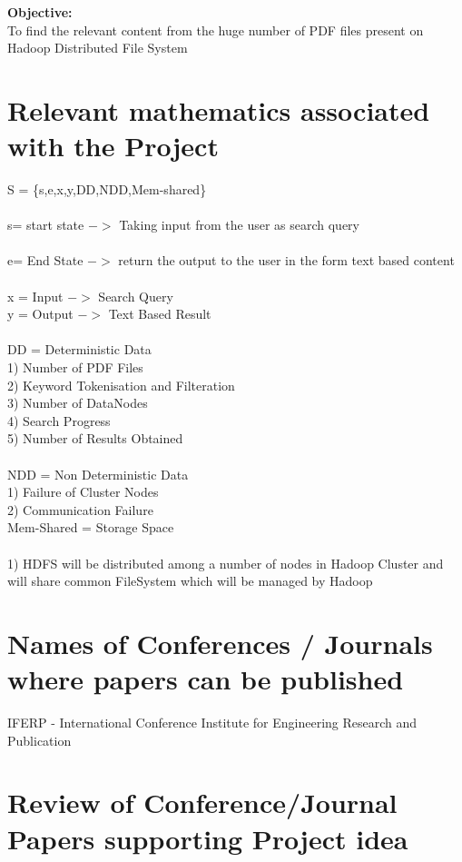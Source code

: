 \documentclass[oneside,a4paper,12pt]{article}
\begin{document}
\noindent \textbf{Objective:} \\
To find the relevant content from the huge number of PDF files present on Hadoop Distributed File System \\

	
\section{Relevant mathematics associated with the Project}
\noindent
S = \{s,e,x,y,DD,NDD,Mem-shared\} \\ \\
s= start state $->$ Taking input from the user as search query\\ \\ e= End State $->$ return the output to the user in the form text based content \\ \\
x = Input $->$ Search Query \\
y = Output $->$ Text Based Result \\ \\ 
DD = Deterministic Data \\
1) Number of PDF Files \\ 
2) Keyword Tokenisation and Filteration \\
3) Number of DataNodes \\
4) Search Progress \\
5) Number of Results Obtained \\ \\
NDD = Non Deterministic Data \\
1) Failure of Cluster Nodes \\
2) Communication Failure  \\
Mem-Shared = Storage Space \\ \\
1) HDFS will be distributed among a number of nodes in Hadoop Cluster and will share common FileSystem which will be managed by Hadoop \\


\section{Names of Conferences / Journals where papers can be published}
IFERP - International Conference Institute for Engineering Research and Publication  


\section{Review of Conference/Journal Papers supporting Project idea}
\end{document}
